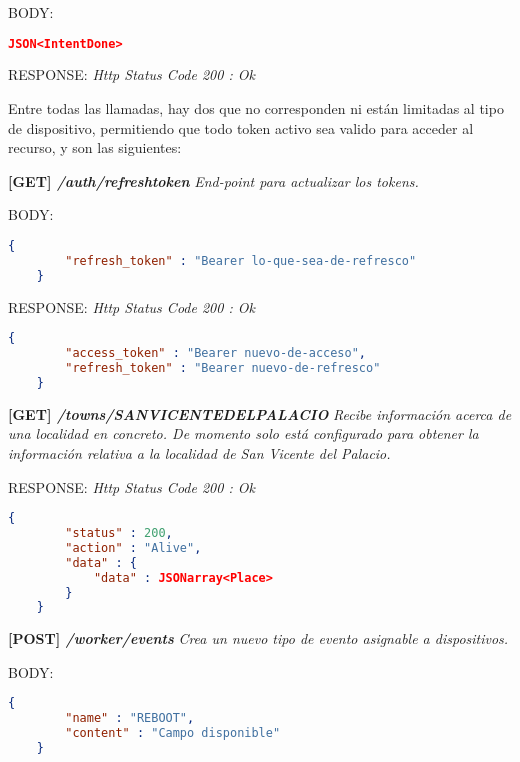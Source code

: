     BODY:
    \begin{lstlisting}[language=json,firstnumber=1]
    JSON<IntentDone>
    \end{lstlisting}
    
    RESPONSE: \newline
    \textit{Http Status Code 200 : Ok}
    
\newpage %

Entre todas las llamadas, hay dos que no corresponden ni están limitadas al tipo de dispositivo, permitiendo que todo token activo sea valido para acceder al recurso, y son las siguientes:

\textbf{[GET] \textit{/auth/refreshtoken }}
\textit{End-point para actualizar los tokens.}

    BODY:
    \begin{lstlisting}[language=json,firstnumber=1]
    {
        "refresh_token" : "Bearer lo-que-sea-de-refresco"
    }
    \end{lstlisting}    

    RESPONSE: \newline
    \textit{Http Status Code 200 : Ok}
    
    \begin{lstlisting}[language=json,firstnumber=1]
    {
        "access_token" : "Bearer nuevo-de-acceso",
        "refresh_token" : "Bearer nuevo-de-refresco"
    }
    \end{lstlisting}
\hline 
\newline
\textbf{[GET] \textit{/towns/SANVICENTEDELPALACIO }}
\textit{Recibe información acerca de una localidad en concreto. De momento solo está configurado para obtener la información relativa a la localidad de San Vicente del Palacio.}
    
    RESPONSE: \newline
    \textit{Http Status Code 200 : Ok}
    \begin{lstlisting}[language=json,firstnumber=1]
    {
        "status" : 200,
        "action" : "Alive",
        "data" : {
            "data" : JSONarray<Place>
        }
    }
    \end{lstlisting}

\newpage %
\textbf{[POST] \textit{/worker/events }}
\textit{Crea un nuevo tipo de evento asignable a dispositivos.}
    
    BODY:
   \begin{lstlisting}[language=json,firstnumber=1]
    {
        "name" : "REBOOT",
        "content" : "Campo disponible"
    }
    \end{lstlisting} 
    
